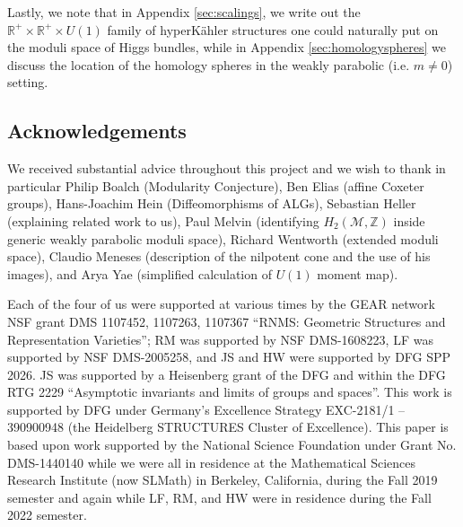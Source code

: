 \documentclass[12pt,letterpaper,reqno]{amsart}
\def\mathbf#1{#1}%
\theoremstyle{remark}
\theoremstyle{definition}
\numberwithin{thm}{section}
\numberwithin{equation}{section}
\numberwithin{figure}{section}
\newcommand{\cM}{\ensuremath{\mathcal M}}
\newcommand{\R}{\ensuremath{\mathbb R}}
\newcommand{\Z}{\ensuremath{\mathbb Z}}
\begin{document}
Lastly, we note that in Appendix \ref{sec:scalings}, we write out the $\R^+ \times \R^+ \times U(1)$ family of hyperK\"ahler structures one could naturally put on the moduli space of Higgs bundles,
while in Appendix \ref{sec:homologyspheres} we discuss the location of the homology spheres in the weakly parabolic (i.e. $\mathbf{m} \neq \mathbf{0}$) setting.


\subsection{Acknowledgements}

We received substantial advice throughout this project and we wish to thank in particular  
Philip Boalch (Modularity Conjecture), 
Ben Elias (affine Coxeter groups), 
Hans-Joachim Hein (Diffeomorphisms of ALGs), 
Sebastian Heller (explaining related work \cite{HHT2025} to us),
Paul Melvin (identifying $H_2(\cM,\Z)$ inside generic weakly parabolic moduli space), 
Richard Wentworth (extended moduli space), 
Claudio Meneses (description of the nilpotent cone and the use of his images), and 
Arya Yae (simplified calculation of $U(1)$ moment map).

Each of the four of us were supported at various times by the GEAR network NSF grant DMS 1107452, 1107263, 1107367  ``RNMS: Geometric Structures and Representation Varieties'';  RM was supported by
NSF DMS-1608223, LF was supported by NSF DMS-2005258, and JS and HW were supported by DFG SPP 2026. JS was supported   by a Heisenberg grant  of the  DFG  and  within the  DFG RTG 2229 ``Asymptotic invariants and limits of groups and spaces''. This work  is supported by   DFG under  Germany's Excellence Strategy EXC-2181/1 -- 390900948 (the Heidelberg  STRUCTURES Cluster of Excellence).
This paper is based upon work supported by the National Science Foundation under Grant No. DMS-1440140 while we were all in residence at the Mathematical Sciences Research Institute (now SLMath) in Berkeley, California, during the Fall 2019 semester and again while LF, RM, and HW were in residence during the Fall 2022 semester.
\end{document}
